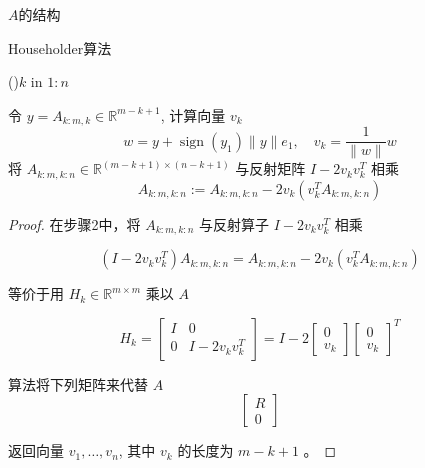 \begin{FigureCenter}{$A$的结构}
\end{FigureCenter}



\begin{algorithm}[htbp]
    \caption{Householder算法}

    \For(){$k$ in $1:n$}{
        令 $ y=A_{k: m, k} \in \mathbb{R}^{m-k+1} $, 计算向量 $ v_{k} $
    $$ w=y+\operatorname{sign}\left(y_{1}\right)\|y\| e_{1}, \quad v_{k}=\frac{1}{\|w\|} w $$\;
    将 $ A_{k: m, k: n} \in \mathbb{R}^{(m-k+1) \times(n-k+1)} $ 与反射矩阵 $ I-2 v_{k} v_{k}^{T} $ 相乘
    $$ A_{k: m, k: n}:=A_{k: m, k: n}-2 v_{k}\left(v_{k}^{T} A_{k: m, k: n}\right) $$\;

    }
    
\end{algorithm}

\begin{proof}
    在步骤2中，将 $ A_{k: m, k: n} $ 与反射算子 $ I-2 v_{k} v_{k}^{T} $ 相乘

$$ \left(I-2 v_{k} v_{k}^{T}\right) A_{k: m, k: n}=A_{k: m, k: n}-2 v_{k}\left(v_{k}^{T} A_{k: m, k: n}\right) $$

等价于用 $ H_{k} \in \mathbb{R}^{m \times m} $ 乘以 $ A $

$$ H_{k}=\left[\begin{array}{cc}I & 0 \\ 0 & I-2 v_{k} v_{k}^{T}\end{array}\right]=I-2\left[\begin{array}{c}0 \\ v_{k}\end{array}\right]\left[\begin{array}{l}0 \\ v_{k}\end{array}\right]^{T} $$

算法将下列矩阵来代替 $ A $
$$
\left[\begin{array}{c}
R \\
0
\end{array}\right]
$$

返回向量 $ v_{1}, \ldots, v_{n} $, 其中 $ v_{k} $ 的长度为 $ m-k+1 $ 。
\end{proof}


